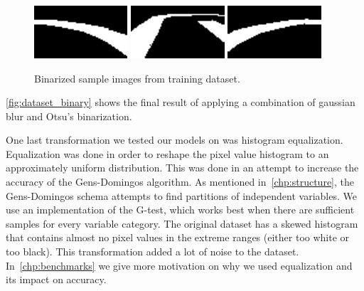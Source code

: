 \begin{figure}[h]
  \centering\includegraphics[width=0.31\textwidth]{imgs/binary_left.png}
  \includegraphics[width=0.31\textwidth]{imgs/binary_up.png}
  \includegraphics[width=0.31\textwidth]{imgs/binary_right.png}
  \caption{Binarized sample images from training dataset.\label{fig:dataset_binary}}
\end{figure}

\autoref{fig:dataset_binary} shows the final result of applying a combination of gaussian blur and
Otsu's binarization.

One last transformation we tested our models on was histogram equalization. Equalization was done
in order to reshape the pixel value histogram to an approximately uniform distribution. This was
done in an attempt to increase the accuracy of the Gens-Domingos algorithm. As mentioned
in~\autoref{chp:structure}, the Gens-Domingos schema attempts to find partitions of independent
variables. We use an implementation of the G-test, which works best when there are sufficient
samples for every variable category. The original dataset has a skewed histogram that contains
almost no pixel values in the extreme ranges (either too white or too black). This transformation
added a lot of noise to the dataset. In~\autoref{chp:benchmarks} we give more motivation on why we
used equalization and its impact on accuracy.

